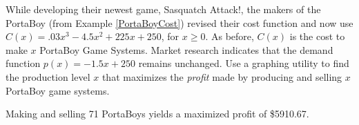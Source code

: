 \documentclass{ximera}
\begin{document}
\begin{problem}\label{newportaboycost}
While developing their newest game, Sasquatch Attack!, the makers of the PortaBoy (from Example \ref{PortaBoyCost}) revised their cost function and now use $C(x) = .03x^{3} - 4.5x^{2} + 225x + 250$, for $x \geq 0$. As before, $C(x)$ is the cost to make $x$ PortaBoy Game Systems.  Market research indicates that the demand function $p(x) = -1.5x + 250$ remains unchanged.  Use a graphing utility to find the production level $x$ that maximizes the \textit{profit} made by producing and selling $x$ PortaBoy game systems.

\begin{solution}
    Making and selling 71 PortaBoys yields a maximized profit of \$5910.67.
\end{solution}

\end{problem}
\end{document}
